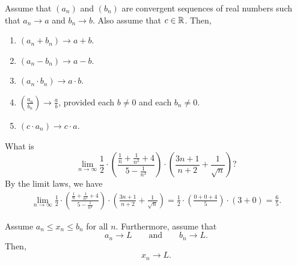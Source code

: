 \begin{theorem}
  Assume that $(a_n)$ and $(b_n)$ are convergent sequences of real
  numbers such that $a_n \to a$ and $b_n \to b$. Also assume that $c
  \in \mathbb R$. Then,
  \begin{enumerate}
    \item $(a_n + b_n) \to a + b$.
    \item $(a_n - b_n) \to a - b$.
    \item $(a_n \cdot b_n) \to a \cdot b$.
    \item $(\frac{a_n}{b_n}) \to \frac{a}{b}$, provided each $b \neq
      0$ and each $b_n \neq 0$.
    \item $(c \cdot a_n) \to c \cdot a$.
  \end{enumerate}
\end{theorem}

\begin{example}
  What is
  \[ \lim_{n\to\infty} \frac{1}{2} \cdot \left(\frac{\frac{1}{n} +
    \frac{1}{n^2} + 4}{5 - \frac{1}{n^2}}\right) \cdot
  \left(\frac{3n+1}{n+2} + \frac{1}{\sqrt{n}}\right)? \]
  By the limit laws, we have
  \begin{align*}
    \lim_{n\to\infty} \frac{1}{2} \cdot \left(\frac{\frac{1}{n} +
    \frac{1}{n^2} + 4}{5 - \frac{1}{n^2}}\right) \cdot
    \left(\frac{3n+1}{n+2} + \frac{1}{\sqrt{n}}\right) = \frac{1}{2}
    \cdot \left(\frac{0 + 0 + 4}{5}\right) \cdot (3 + 0) = \frac{6}{5}.
  \end{align*}
\end{example}

\begin{theorem}
  Assume $a_n \leq x_n \leq b_n$ for all $n$. Furthermore, assume that
  \[ a_n \to L \qquad \text{and} \qquad b_n \to L. \]
  Then,
  \[ x_n \to L. \]
\end{theorem}

